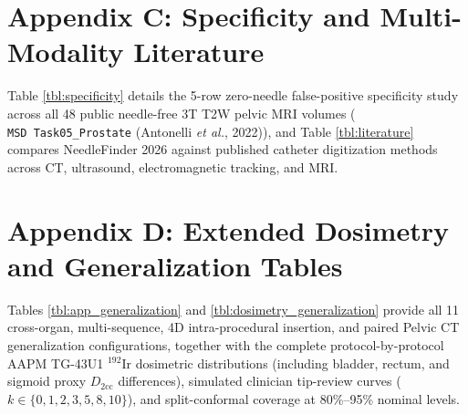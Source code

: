 \documentclass[
  11pt,
]{article}
\let\nforigtexttt\texttt
\renewcommand{\texttt}[1]{\nforigtexttt{\XeTeXinterchartokenstate=1 #1}}
\begin{document}
\section{Appendix C: Specificity and Multi-Modality
Literature}\label{appendix-c-specificity-and-multi-modality-literature}

Table \ref{tbl:specificity} details the 5-row zero-needle false-positive
specificity study across all 48 public needle-free 3T T2W pelvic MRI
volumes (\texttt{MSD\ Task05\_Prostate} (Antonelli \emph{et al.},
2022)), and Table \ref{tbl:literature} compares NeedleFinder 2026
against published catheter digitization methods across CT, ultrasound,
electromagnetic tracking, and MRI.





\section{Appendix D: Extended Dosimetry and Generalization
Tables}\label{appendix-d-extended-dosimetry-and-generalization-tables}

Tables \ref{tbl:app_generalization} and
\ref{tbl:dosimetry_generalization} provide all 11 cross-organ,
multi-sequence, 4D intra-procedural insertion, and paired Pelvic CT
generalization configurations, together with the complete
protocol-by-protocol AAPM TG-43U1 \(^{192}\text{Ir}\) dosimetric
distributions (including bladder, rectum, and sigmoid proxy
\(D_{2\text{cc}}\) differences), simulated clinician tip-review curves
(\(k \in \{0, 1, 2, 3, 5, 8, 10\}\)), and split-conformal coverage at
80\%--95\% nominal levels.




\end{document}
